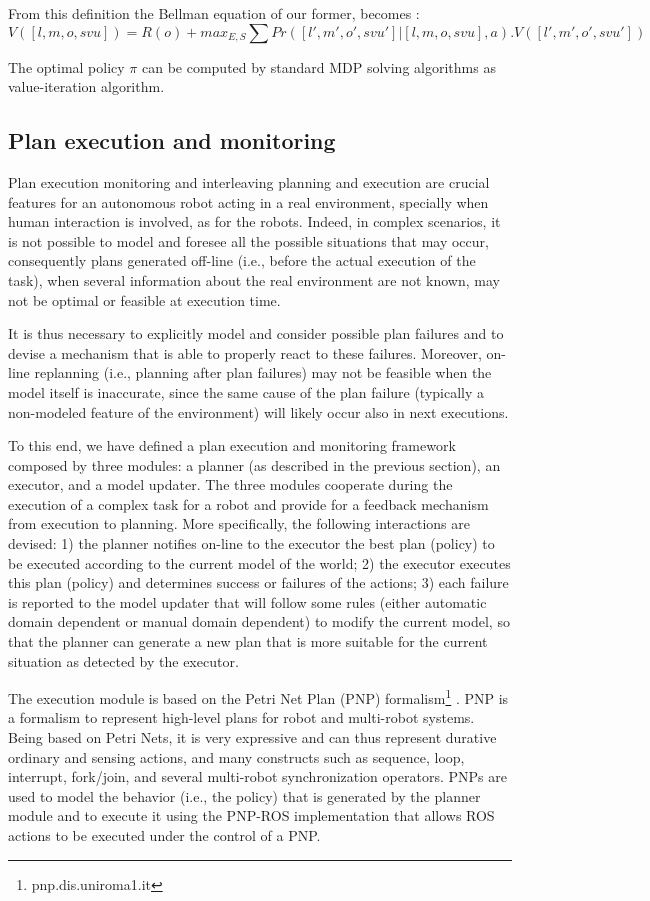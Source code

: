 From this definition the Bellman equation of our former, becomes : 
\[ V([l,m,o,svu]) = R(o) + max_{E,S} \sum Pr([l',m',o',svu'] | [l,m,o,svu], a). V([l',m',o',svu'] )  \]

The optimal policy $\pi$ can be computed by standard MDP solving algorithms as value-iteration algorithm. 


\subsection{Plan execution and monitoring}


Plan execution monitoring and interleaving planning and execution are crucial features for an autonomous robot acting in a real environment, specially when human interaction is involved, 
as for the \coaches robots. Indeed, in complex scenarios, it is not possible to model and foresee all the possible situations that may occur, consequently plans generated off-line (i.e., before the actual execution of the task), when several information about the real environment are not known, may not be optimal or feasible at execution time.

It is thus necessary to explicitly model and consider possible plan failures and to devise a mechanism that is able to properly react to these failures. Moreover, on-line replanning (i.e., planning after plan failures) may not be feasible when the model itself is inaccurate, since the same cause of the plan failure (typically a non-modeled feature of the environment) will likely occur also in next executions.

To this end, we have defined a plan execution and monitoring framework composed by three modules: a planner (as described in the previous section), an executor, and a model updater. The three modules cooperate during the execution of a complex task for a robot and provide for a feedback mechanism from execution to planning.
More specifically, the following interactions are devised:
1) the planner notifies on-line to the executor the best plan (policy) to be executed according to the current model of the world; 2) the executor executes this plan (policy) and determines success or failures of the actions; 3) each failure is reported to the model updater that will follow some rules (either automatic domain dependent or manual domain dependent) to modify the current model, so that the planner can generate a new plan that is more suitable for the current situation as detected by the executor.

The execution module is based on the Petri Net Plan (PNP) formalism\footnote{pnp.dis.uniroma1.it} \cite{ZiIo11PNP}. 
PNP is a formalism to represent high-level plans for robot and multi-robot systems. Being based on Petri Nets, it is very expressive and can thus represent durative ordinary and sensing actions, and many constructs such as sequence, loop, interrupt, fork/join, and several multi-robot synchronization operators.
PNPs are used to model the behavior (i.e., the policy) that is generated by the planner module and to execute it using the PNP-ROS implementation that allows ROS actions to be executed under the control of a PNP.


